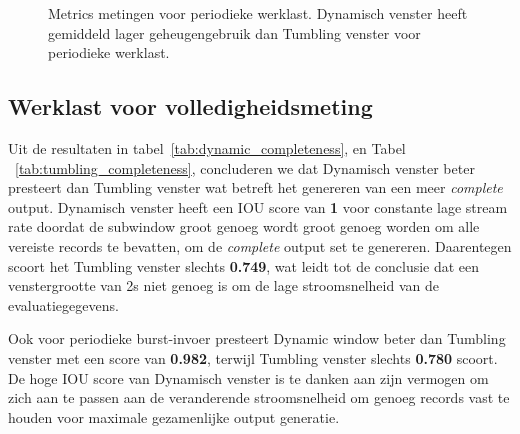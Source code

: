 \begin{figure}
    \caption[Metriek metingen voor periodieke werklast]
    {Metrics metingen voor periodieke werklast. Dynamisch venster 
    heeft gemiddeld lager geheugengebruik dan Tumbling venster voor
periodieke werklast. }%
    \label{fig:periodic_measurement}
\end{figure}

\subsection{Werklast voor volledigheidsmeting}%
\label{sec:Workload for completeness measure}

Uit de resultaten in tabel~\ref{tab:dynamic_completeness}, en 
Tabel ~\ref{tab:tumbling_completeness}, concluderen we dat Dynamisch venster 
beter presteert dan Tumbling venster wat betreft het genereren van een meer \emph{complete} output. 
Dynamisch venster heeft een IOU score van \textbf{1} voor constante lage stream rate
doordat de subwindow groot genoeg wordt 
groot genoeg worden om alle vereiste records te bevatten, om de \emph{complete} output set te genereren. Daarentegen scoort het Tumbling venster slechts \textbf{0.749}, wat leidt tot 
de conclusie dat een venstergrootte van 2s niet genoeg is om de lage stroomsnelheid 
van de evaluatiegegevens. 

Ook voor periodieke burst-invoer presteert Dynamic window beter dan Tumbling venster met een
score van \textbf{0.982}, terwijl Tumbling venster slechts \textbf{0.780} scoort. De hoge IOU 
score van Dynamisch venster is te danken aan zijn vermogen  
om zich aan te passen aan de veranderende stroomsnelheid om genoeg 
records vast te houden voor maximale gezamenlijke output generatie.


\begin{table}[htbp]
    \centering
\caption{Dynamisch venster meting van volledigheid.}
\label{tab:dynamic_completeness}
\end{table}

\begin{table}[htbp]
    \centering
\caption{Tumbling venster meting van volledigheid. }
\label{tab:tumbling_completeness}
\end{table}


